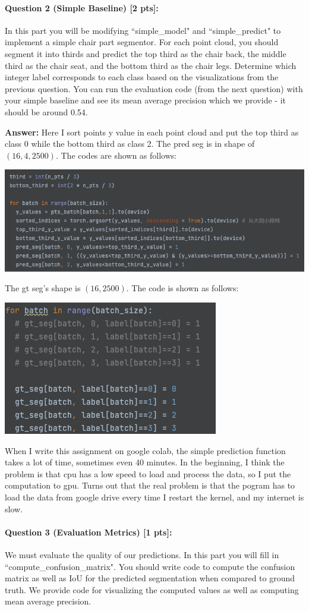 \documentclass[11pt]{article}
\begin{document}
\paragraph{Question 2 (Simple Baseline) [2 pts]:} 
In this part you will be modifying ``simple\_model" and ``simple\_predict" to implement a simple chair part segmentor. For each point cloud, you should segment it into thirds and predict the top third as the chair back, the middle third as the chair seat, and the bottom third as the chair legs. Determine which integer label corresponds to each class based on the visualizations from the previous question. You can run the evaluation code (from the next question) with your simple baseline and see its mean average precision which we provide - it should be around 0.54.

\textbf{Answer:} Here I sort points y value in each point cloud and put the top third as class 0 while the bottom third as class 2. The pred seg is in shape of $(16,4,2500)$. The codes are shown as follows:
\begin{center}
    \small
    \includegraphics[width=0.3\linewidth]{fig/Q2code.png}
\end{center}
The gt seg's shape is $(16, 2500)$. The code is shown as follows:
\begin{center}
    \small
    \includegraphics[width=0.3\linewidth]{fig/Q2code1.png}
\end{center}
When I write this assignment on google colab, the simple prediction function takes a lot of time, sometimes even 40 minutes. In the beginning, I think the problem is that cpu has a low speed to load and process the data, so I put the computation to gpu. Turns out that the real problem is that the pogram has to load the data from google drive every time I restart the kernel, and my internet is slow.

\paragraph{Question 3 (Evaluation Metrics) [1 pts]:}  
We must evaluate the quality of our predictions. In this part you will fill in ``compute\_confusion\_matrix". You should write code to compute the confusion matrix as well as IoU for the predicted segmentation when compared to ground truth. We provide code for visualizing the computed values as well as computing mean average precision.
\end{document}
